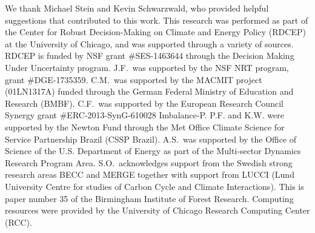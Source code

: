 \documentclass[esd, manuscript]{copernicus} %
\begin{document}
\noappendix %



\begin{acknowledgements}
We thank Michael Stein and Kevin Schwarzwald, who provided helpful suggestions that contributed to this work. This research was performed as part of the Center for Robust Decision-Making on Climate and Energy Policy (RDCEP) at the University of Chicago, and was supported through a variety of sources. RDCEP is funded by NSF grant \#SES-1463644 through the Decision Making Under Uncertainty program. J.F.\ was supported by the NSF NRT program, grant \#DGE-1735359. C.M.\ was supported by the MACMIT project (01LN1317A) funded through the German Federal Ministry of Education and Research (BMBF).  C.F.\ was supported by the European Research Council Synergy grant \#ERC-2013-SynG-610028 Imbalance-P. P.F. and K.W. were supported  by the Newton Fund through the Met Office Climate Science for Service Partnership Brazil (CSSP Brazil). A.S.\ was supported by the Office of Science of the U.S. Department of Energy as part of the Multi-sector Dynamics Research Program Area. S.O.\ acknowledges support from the Swedish strong research areas BECC and MERGE together with support from LUCCI (Lund University Centre for studies of Carbon Cycle and Climate Interactions). This is paper number 35 of the Birmingham Institute of Forest Research. Computing resources were provided by the University of Chicago Research Computing Center (RCC).
\end{acknowledgements}



\end{document}
